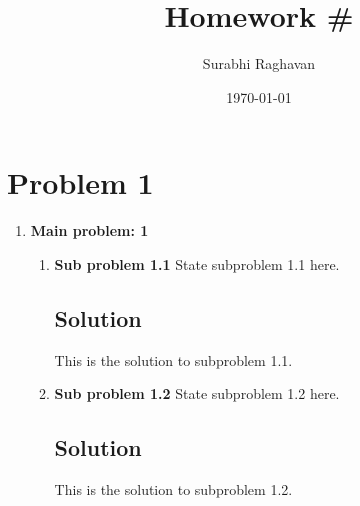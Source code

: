\documentclass[12pt]{article}
\newcommand{\yourname}{Surabhi Raghavan}  %
\begin{document}
\title{Homework \#}
\author{\yourname}
\date{\today}

\maketitle

\section*{Problem 1}
\begin{enumerate}
    \item \textbf{Main problem: 1}
    \begin{enumerate}
        \item \textbf{Sub problem 1.1}
        State subproblem 1.1 here.
        
        \subsection*{Solution}
        This is the solution to subproblem 1.1.
        
        \item \textbf{Sub problem 1.2}
        State subproblem 1.2 here.
        
        \subsection*{Solution}
        This is the solution to subproblem 1.2.
    \end{enumerate}
\end{enumerate}
\end{document}

